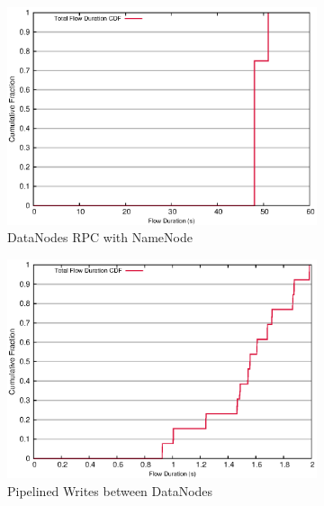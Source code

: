 \begin{figure}[!htbp]
\label{fig:replica_duration}
\centering
  \begin{subfigure}[b]{.45\linewidth}
   \centering
	\includegraphics[width=.99\textwidth]{figures/replica_change/24_28_flow_duration.eps} 
	\caption{DataNodes RPC with NameNode}\label{fig:replica_duration:rpc}
   \end{subfigure}%
  \begin{subfigure}[b]{.45\linewidth}
   \centering
	\includegraphics[width=.99\textwidth]{figures/replica_change/36_32_flow_duration.eps} 
	\caption{Pipelined Writes between DataNodes}\label{fig:replica_duration:pipe_write}
   \end{subfigure} \\%
  \begin{subfigure}[b]{.55\linewidth}

\end{subfigure}
\end{figure}
